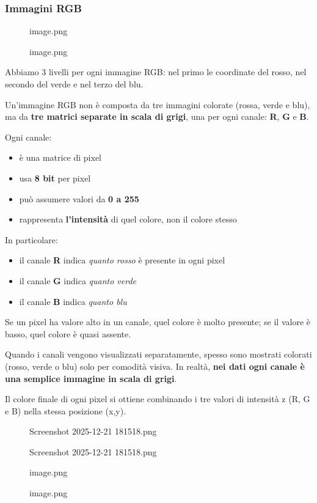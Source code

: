 \documentclass[
]{article}
\providecommand{\tightlist}{%
  \setlength{\itemsep}{0pt}\setlength{\parskip}{0pt}}
\begin{document}
\hypertarget{immagini-rgb}{%
\subsubsection{Immagini RGB}\label{immagini-rgb}}

\begin{figure}
\centering
{image.png}
\caption{image.png}
\end{figure}

Abbiamo 3 livelli per ogni immagine RGB: nel primo le coordinate del rosso, nel secondo del verde e nel terzo del blu.

Un'immagine RGB non è composta da tre immagini colorate (rossa, verde e blu), ma da \textbf{tre matrici separate in scala di grigi}, una per ogni canale: \textbf{R}, \textbf{G} e \textbf{B}.

Ogni canale:

\begin{itemize}
\tightlist
\item
  è una matrice di pixel
\item
  usa \textbf{8 bit} per pixel
\item
  può assumere valori da \textbf{0 a 255}
\item
  rappresenta \textbf{l'intensità} di quel colore, non il colore stesso
\end{itemize}

In particolare:

\begin{itemize}
\tightlist
\item
  il canale \textbf{R} indica \emph{quanto rosso} è presente in ogni pixel
\item
  il canale \textbf{G} indica \emph{quanto verde}
\item
  il canale \textbf{B} indica \emph{quanto blu}
\end{itemize}

Se un pixel ha valore alto in un canale, quel colore è molto presente; se il valore è basso, quel colore è quasi assente.

Quando i canali vengono visualizzati separatamente, spesso sono mostrati colorati (rosso, verde o blu) solo per comodità visiva. In realtà, \textbf{nei dati ogni canale è una semplice immagine in scala di grigi}.

Il colore finale di ogni pixel si ottiene combinando i tre valori di intensità z (R, G e B) nella stessa posizione (x,y).

\begin{figure}
\centering
{Screenshot 2025-12-21 181518.png}
\caption{Screenshot 2025-12-21 181518.png}
\end{figure}

\begin{figure}
\centering
{image.png}
\caption{image.png}
\end{figure}
\end{document}
